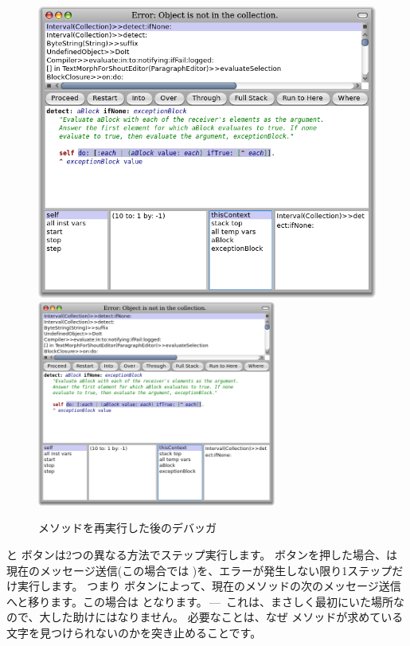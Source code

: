 \documentclass[a4paper,10pt,twoside]{book}
\begin{document}
\begin{figure}[btp]
\begin{center}
\ifluluelse
{\includegraphics[width=\textwidth]{RestartDetectIfNone}}
{\includegraphics[width=0.7\textwidth]{RestartDetectIfNone}}
\end{center}
\caption{ メソッドを再実行した後のデバッガ}
\end{figure}

 と  ボタンは2つの異なる方法でステップ実行します。 ボタンを押した場合、\pharo は現在のメッセージ送信(この場合では )を、エラーが発生しない限り1ステップだけ実行します。
つまり  ボタンによって、現在のメソッドの次のメッセージ送信へと移ります。この場合は  となります。\,---\, これは、まさしく最初にいた場所なので、大した助けにはなりません。
必要なことは、なぜ  メソッドが求めている文字を見つけられないのかを突き止めることです。
\end{document}
